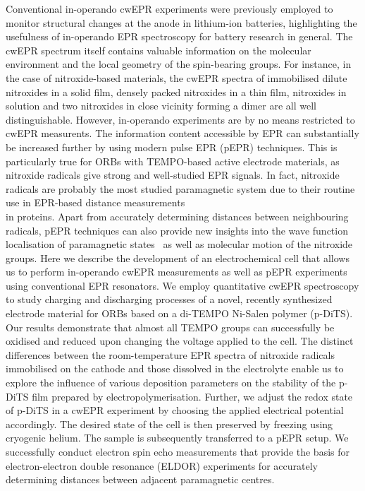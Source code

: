 \documentclass{WileyMSP-template}
\begin{document}
\bigbreak
Conventional in-operando cwEPR experiments were previously employed to monitor structural changes at the anode in lithium-ion batteries,\cite{wandt2015_ees} highlighting the usefulness of in-operando EPR spectroscopy for battery research in general. The cwEPR spectrum itself contains valuable information on the molecular environment and the local geometry of the spin-bearing groups. For instance, in the case of nitroxide-based materials, the cwEPR spectra of immobilised dilute nitroxides in a solid film, densely packed nitroxides in a thin film, nitroxides in solution and two nitroxides in close vicinity forming a dimer are all well distinguishable.\cite{santangelo2008_jpcb,clark2016_concmagnres}
\bigbreak
However, in-operando experiments are by no means restricted to cwEPR measurents. The information content accessible by EPR can substantially be increased further by using modern pulse EPR (pEPR) techniques.\cite{schweiger2001_book} This is particularly true for ORBs with TEMPO-based active electrode materials, as nitroxide radicals give strong and well-studied EPR signals. In fact, nitroxide radicals are probably the most studied paramagnetic system due to their routine use in EPR-based distance measurements\\ in proteins.\cite{jeschke2012_annrevphyschem} Apart from accurately determining distances between neighbouring radicals, pEPR techniques can also provide new insights into the wave function localisation of paramagnetic states~\cite{steyrleuthner2017_pccp} as well as molecular motion of the nitroxide groups.\cite{clark2016_concmagnres}
\bigbreak
Here we describe the development of an electrochemical cell that allows us to perform in-operando cwEPR measurements as well as pEPR experiments using conventional EPR resonators. We employ quantitative cwEPR spectroscopy to study charging and discharging processes of a novel, recently synthesized electrode material for ORBs based on a di-TEMPO Ni-Salen polymer (p-DiTS).\cite{vereshchagin2020_battandsupercaps} Our results demonstrate that almost all TEMPO groups can successfully be oxidised and reduced upon changing the voltage applied to the cell. The distinct differences between the room-temperature EPR spectra of nitroxide radicals immobilised on the cathode and those dissolved in the electrolyte enable us to explore the influence of various deposition parameters on the stability of the p-DiTS film prepared by electropolymerisation. Further, we adjust the redox state of p-DiTS in a cwEPR experiment by choosing the applied electrical potential accordingly. The desired state of the cell is then preserved by freezing using cryogenic helium. The sample is subsequently transferred to a pEPR setup. We successfully conduct electron spin echo measurements that provide the basis for electron-electron double resonance (ELDOR) experiments for accurately determining distances between adjacent paramagnetic centres.
\end{document}
